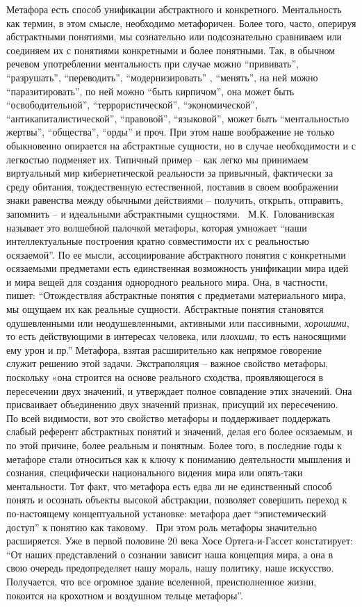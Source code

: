 Метафора есть способ унификации абстрактного и конкретного. Ментальность как термин,
в этом смысле, необходимо метафоричен. Более того, часто, оперируя абстрактными понятиями,
мы сознательно или подсознательно сравниваем или соединяем их с понятиями конкретными и
более понятными. Так, в обычном речевом употреблении ментальность при случае можно ``прививать'',
``разрушать'', ``переводить'', ``модернизировать'' , ``менять'', на ней можно ``паразитировать'',
по ней можно ``быть кирпичом'', она может быть ``освободительной'',
``террористической'', ``экономической'', ``антикапиталистической'', ``правовой'', ``языковой'',
может быть ``ментальностью жертвы'', ``общества'', ``орды'' и проч. При этом наше
воображение не только обыкновенно опирается на абстрактные сущности, но в случае необходимости
и с легкостью подменяет их. Типичный пример -- как легко мы принимаем виртуальный
мир кибернетической реальности за привычный, фактически за среду обитания,
тождественную естественной, поставив в своем воображении знаки равенства между обычными действиями --
получить, открыть, отправить, запомнить -- и идеальными абстрактными сущностями.~
\autocite{ivanov_virtual} М.К.~Голованивская называет это волшебной палочкой метафоры,
которая умножает ``наши интеллектуальные построения кратно совместимости их с реальностью осязаемой''.
По ее мысли, ассоциирование абстрактного понятия с конкретными осязаемыми предметами есть
единственная возможность унификации мира идей и мира вещей для создания однородного
реального мира. Она, в частности, пишет: ``Отождествляя абстрактные понятия с предметами материального мира,
мы ощущаем их как реальные сущности. Абстрактные понятия становятся одушевленными или неодушевленными,
активными или пассивными, \emph{хорошими}, то есть действующими в интересах человека, или
\emph{плохими}, то есть наносящими ему урон и пр.'' Метафора, взятая расширительно как непрямое
говорение~\autocite{lingvo_dictionary} служит решению этой задачи. Экстраполяция --
важное свойство метафоры, поскольку «она строится на основе реального сходства,
проявляющегося в пересечении двух значений, и утверждает полное совпадение этих значений.
Она присваивает объединению двух значений признак, присущий их пересечению.~\autocite{razlogova}
По всей видимости, вот это свойство метафоры и поддерживает поддержать слабый референт
абстрактных понятий и значений, делая его более осязаемым, и по этой причине, более
реальным и понятным. Более того, в последние годы к метафоре стали относиться как к ключу
к пониманию деятельности мышления и сознания, специфически национального видения мира или опять-таки
ментальности. Тот факт, что метафора есть едва ли не единственный способ понять и осознать
объекты высокой абстракции, позволяет совершить переход к по-настоящему концептуальной установке:
метафора дает ``эпистемический доступ'' к понятию как таковому.~\autocite{boyd}
При этом роль метафоры значительно расширяется. Уже в первой половине 20 века
Хосе Ортега-и-Гассет констатирует: ``От наших представлений о сознании зависит наша
концепция мира, а она в свою очередь предопределяет нашу мораль, нашу политику,
наше искусство. Получается, что все огромное здание вселенной, преисполненное жизни,
покоится на крохотном и воздушном тельце метафоры''.~\autocite{metaphors}

